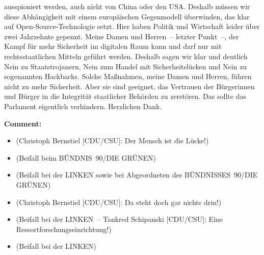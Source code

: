 \documentclass{article}
\begin{document}
ausspioniert werden, auch nicht von China oder den USA.  Deshalb müssen wir diese Abhängigkeit mit einem europäischen Gegenmodell überwinden, das klar auf Open-Source-Technologie setzt. Hier haben Politik und Wirtschaft leider über zwei Jahrzehnte gepennt. Meine Damen und Herren – letzter Punkt –, der Kampf für mehr Sicherheit im digitalen Raum kann und darf nur mit rechtsstaatlichen Mitteln geführt werden. Deshalb sagen wir klar und deutlich Nein zu Staatstrojanern, Nein zum Handel mit Sicherheitslücken und Nein zu sogenannten Hackbacks.  Solche Maßnahmen, meine Damen und Herren, führen nicht zu mehr Sicherheit. Aber sie sind geeignet, das Vertrauen der Bürgerinnen und Bürger in die Integrität staatlicher Behörden zu zerstören. Das sollte das Parlament eigentlich verhindern. Herzlichen Dank.  

\noindent\textbf{Comment:}
\begin{itemize}
    \setlength\itemsep{-3pt}
    \item (Christoph Bernstiel [CDU/CSU]: Der Mensch ist die Lücke!)
    \setlength\itemsep{-3pt}
    \item (Beifall beim BÜNDNIS 90/DIE GRÜNEN)
    \setlength\itemsep{-3pt}
    \item (Beifall bei der LINKEN sowie bei Abgeordneten des BÜNDNISSES 90/DIE GRÜNEN)
    \setlength\itemsep{-3pt}
    \item (Christoph Bernstiel [CDU/CSU]: Da steht doch gar nichts drin!)
    \setlength\itemsep{-3pt}
    \item (Beifall bei der LINKEN – Tankred Schipanski [CDU/CSU]: Eine Ressortforschungseinrichtung!)
    \setlength\itemsep{-3pt}
    \item (Beifall bei der LINKEN)
\end{itemize}
\end{document}
